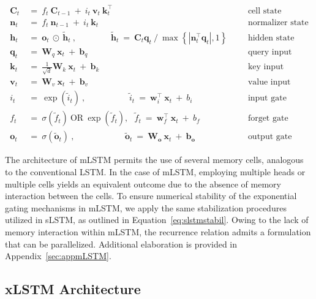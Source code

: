 \begin{align}
\label{eq:mlstm_recurrent_begin}
\mathbf{C}_t \ &= \  f_t \ \mathbf{C}_{t-1} \ + \ 
  i_t \ \mathbf{v}_t \ \mathbf{k}_t^\top & &  &\text{cell state} \\
\mathbf{n}_t \ &= \  f_t \ \mathbf{n}_{t-1} \ + \ 
  i_t \ \mathbf{k}_t & &  &\text{normalizer state} \\
\mathbf{h}_t  \ &= \ \mathbf{o}_t \ \odot \ \tilde{\mathbf{h}}_t
\ , \qquad \qquad 
\tilde{\mathbf{h}}_t \ = \   \mathbf{C}_t \mathbf{q}_t \ / \ 
  \max \left\{ |\mathbf{n}_t^\top \mathbf{q}_t|, 1 \right\} 
   &&&\text{hidden state} \\
\mathbf{q}_t \ &= \ \mathbf{W}_q \ \mathbf{x}_t \ + \ \mathbf{b}_q  & &  &\text{query input} \\
\mathbf{k}_t \ &= \ \frac{1}{\sqrt{d}} \mathbf{W}_k \ \mathbf{x}_t \ + \ \mathbf{b}_k  & &  &\text{key input} \\
\mathbf{v}_t \ &= \ \mathbf{W}_v \ \mathbf{x}_t \ + \ \mathbf{b}_v  & &  &\text{value input} \\
i_t \ &= \ \!\exp \!  \! \left( \tilde{i}_t  \right) \ , 
 \qquad \qquad \ \ \ \ \,
  \tilde{i}_t \ = \ \mathbf{w}^\top_{i} \ \mathbf{x}_t \ + \  b_{i} \ \ \ 
  &&&\text{input gate} \\
f_t \ &= \ \sigma \!  \left(  \tilde{f}_t \right) \ \text{OR} \ \!\exp \!  \! \left(  \tilde{f}_t \right) , \ \ \: \!
\tilde{f}_t \ = \ \mathbf{w}^\top_{f} \ \mathbf{x}_t  \ + \
  b_{f}
  &&& \text{forget gate} \\
\label{eq:mlstm_recurrent_end}
\mathbf{o}_t \ &= \ \sigma \left( \tilde{\mathbf{o}}_t \right) \ , \qquad \qquad \quad \ \ \ \,
  \tilde{\mathbf{o}}_t  \ = \ \mathbf{W}_{\mathbf{o}} \ \mathbf{x}_t \ + \
  \mathbf{b}_{\mathbf{o}}
  &&&\text{output gate} 
\end{align}

The architecture of mLSTM permits the use of several memory cells, analogous to the conventional LSTM. In the case of mLSTM, employing multiple heads or multiple cells yields an equivalent outcome due to the absence of memory interaction between the cells. To ensure numerical stability of the exponential gating mechanisms in mLSTM, we apply the same stabilization procedures utilized in sLSTM, as outlined in Equation~\ref{eq:slstmstabil}. Owing to the lack of memory interaction within mLSTM, the recurrence relation admits a formulation that can be parallelized. Additional elaboration is provided in Appendix~\ref{sec:appmLSTM}.

\subsection{xLSTM Architecture}
\label{sec:xLSTMarch}

